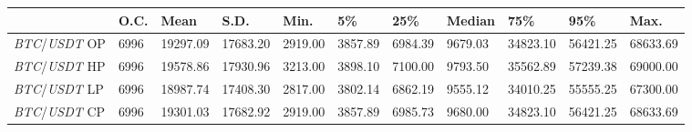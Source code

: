 \begin{tabular}{lllllllllll}
\toprule
 & \textbf{O.C.} & \textbf{Mean} & \textbf{S.D.} & \textbf{Min.} & \textbf{5\%} & \textbf{25\%} & \textbf{Median} & \textbf{75\%} & \textbf{95\%} & \textbf{Max.} \\
\midrule
\emph{BTC}/\emph{USDT} OP & 6996 & 19297.09 & 17683.20 & 2919.00 & 3857.89 & 6984.39 & 9679.03 & 34823.10 & 56421.25 & 68633.69 \\
\emph{BTC}/\emph{USDT} HP & 6996 & 19578.86 & 17930.96 & 3213.00 & 3898.10 & 7100.00 & 9793.50 & 35562.89 & 57239.38 & 69000.00 \\
\emph{BTC}/\emph{USDT} LP & 6996 & 18987.74 & 17408.30 & 2817.00 & 3802.14 & 6862.19 & 9555.12 & 34010.25 & 55555.25 & 67300.00 \\
\emph{BTC}/\emph{USDT} CP & 6996 & 19301.03 & 17682.92 & 2919.00 & 3857.89 & 6985.73 & 9680.00 & 34823.10 & 56421.25 & 68633.69 \\
\bottomrule
\end{tabular}
